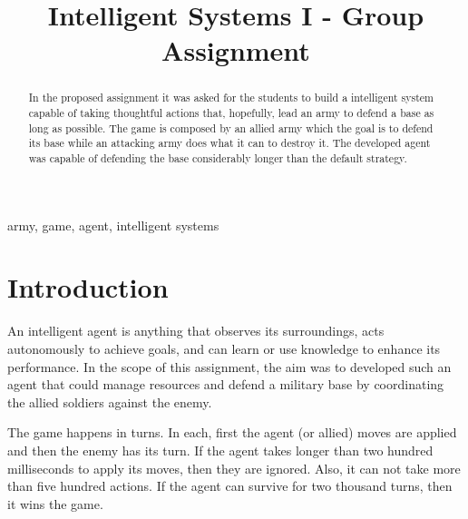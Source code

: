 \documentclass[conference]{IEEEtran}
\begin{document}
\title{Intelligent Systems I - Group Assignment
}

\author{
}

\maketitle

\begin{abstract}
In the proposed assignment it was asked for the students to build a intelligent system capable of taking thoughtful actions that, hopefully, lead an army to defend a base as long as possible. The game is composed by an allied army which the goal is to defend its base while an attacking army does what it can to destroy it. The developed agent was capable of defending the base considerably longer than the default strategy.
\end{abstract}

\begin{IEEEkeywords}
army, game, agent, intelligent systems
\end{IEEEkeywords}

\section{Introduction}


An intelligent agent is anything that observes its surroundings, acts autonomously to achieve goals, and can learn or use knowledge to enhance its performance. In the scope of this assignment, the aim was to developed such an agent that could manage resources and defend a military base by coordinating the allied soldiers against the enemy. 





The game happens in turns. In each, first the agent (or allied) moves are applied and then the enemy has its turn. If the agent takes longer than two hundred milliseconds to apply its moves, then they are ignored. Also, it can not take more than five hundred actions. If the agent can survive for two thousand turns, then it wins the game.
\end{document}
